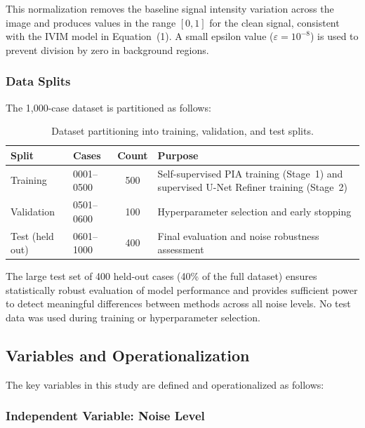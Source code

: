 \documentclass[12pt]{article}
\begin{document}
This normalization removes the baseline signal intensity variation across the image and produces values in the range $[0, 1]$ for the clean signal, consistent with the IVIM model in Equation~(1). A small epsilon value ($\varepsilon = 10^{-8}$) is used to prevent division by zero in background regions.

\subsubsection{Data Splits}

The 1,000-case dataset is partitioned as follows:

\begin{table}[h]
\centering
\caption{Dataset partitioning into training, validation, and test splits.}
\label{tab:data_splits}
\begin{tabular}{llcl}
\toprule
\textbf{Split} & \textbf{Cases} & \textbf{Count} & \textbf{Purpose} \\
\midrule
Training            & 0001--0500 & 500 & Self-supervised PIA training (Stage~1) and supervised U-Net Refiner training (Stage~2) \\
Validation          & 0501--0600 & 100 & Hyperparameter selection and early stopping \\
Test (held out)     & 0601--1000 & 400 & Final evaluation and noise robustness assessment \\
\bottomrule
\end{tabular}
\end{table}

The large test set of 400 held-out cases (40\% of the full dataset) ensures statistically robust evaluation of model performance and provides sufficient power to detect meaningful differences between methods across all noise levels. No test data was used during training or hyperparameter selection.

\subsection{Variables and Operationalization}

The key variables in this study are defined and operationalized as follows:

\subsubsection{Independent Variable: Noise Level}
\end{document}
